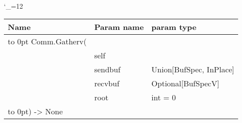 \begingroup \catcode`\_=12 \tt
\begin{tabular}{lll}
\toprule
\textrm{Name}&\textrm{Param name}&\textrm{param type}\\
\midrule
\hbox to 0pt {Comm.Gatherv(\hss}\\
& self\\
& sendbuf & Union[BufSpec, InPlace]\\
& recvbuf & Optional[BufSpecV]\\
& root & int = 0\\
\hbox to 0pt{) -> None\hss}\\
\bottomrule
\end{tabular}
\endgroup
